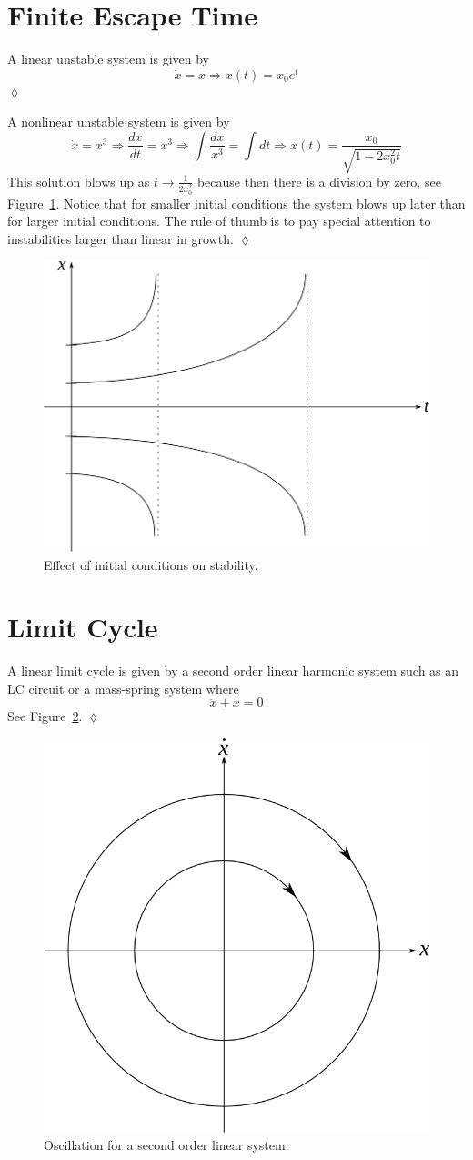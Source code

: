 \section{Finite Escape Time}
\label{sec:01fet}
\begin{example}
A linear unstable system is given by
$$\dot{x} = x \Rightarrow x(t) = x_0e^t$$
$\lozenge$
\end{example}

\begin{example}
A nonlinear unstable system is given by
$$\dot{x} = x^3 \Rightarrow \frac{dx}{dt}=x^3 \Rightarrow \int\frac{dx}{x^3} = \int dt \Rightarrow x(t) = \frac{x_0}{\sqrt{1-2x_0^2t}}$$
This solution blows up as $t\to\frac{1}{2x_0^2}$ because then there is a division by zero, see Figure~\ref{fig:01blowup}. Notice that for smaller initial conditions the system blows up later than for larger initial conditions. The rule of thumb is to pay special attention to instabilities larger than linear in growth.
$\lozenge$
\end{example}

\begin{figure}[ht!]
\centering
\includegraphics[width=.4\textwidth]{images/01blowup}
\caption{Effect of initial conditions on stability.}
\label{fig:01blowup}
\end{figure}

\section{Limit Cycle}
\begin{example}
A linear limit cycle is given by a second order linear harmonic system such as an LC circuit or a mass-spring system where
$$\ddot{x} + x = 0$$
See Figure~\ref{fig:01secondorder}.
$\lozenge$
\end{example}

\begin{figure}[ht!]
\centering
\includegraphics[width=.4\textwidth]{images/01secondorder}
\caption{Oscillation for a second order linear system.}
\label{fig:01secondorder}
\end{figure}

